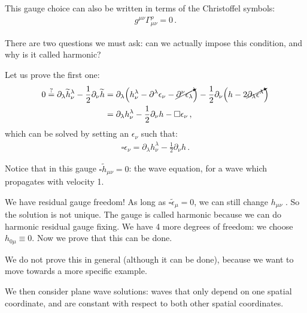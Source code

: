 \documentclass[main.tex]{subfiles}
\begin{document}
\begin{bluebox}
This gauge choice can also be written in terms of the Christoffel symbols: 
%
\begin{align}
g^{\mu \nu } \Gamma^{\rho }_{\mu \nu } = 0
\,.
\end{align}
%
\end{bluebox}

There are two questions we must ask: can we actually impose this condition, and why is it called harmonic? 

Let us prove the first one: 
%
\begin{subequations}
\begin{align}
0 \overset{?}{=} \partial_{\lambda } \widetilde{h}^{\lambda }_{\nu } - \frac{1}{2} \partial_{\nu }\widetilde{h}
&= \partial_{\lambda } \qty( h^{\lambda }_{\nu } - \partial^{\lambda } \epsilon_{\nu } - \cancelto{}{\partial^{\nu } \epsilon_{\lambda }} ) - \frac{1}{2} \partial_{\nu } \qty(h - 2 \cancelto{}{\partial_{\lambda } \epsilon^{\lambda }})  \\
&= \partial_{\lambda } h^{\lambda }_{\nu } - \frac{1}{2} \partial_{\nu } h  - \square \epsilon_{\nu }
\,,
\end{align}
\end{subequations}
%
which can be solved by setting an \(\epsilon_{\nu }\) such that:
%
\begin{align}
  \square  \epsilon_{\nu } = \partial_{\lambda } h^{\lambda }_{\nu } - \frac{1}{2} \partial_{\nu } h
\,.
\end{align}

Notice that in this gauge \(\square \widetilde{h}_{\mu \nu } = 0 \): the wave equation, for a wave which propagates with velocity 1. 

We have residual gauge freedom! As long as \(\square \widetilde{\epsilon}_{\mu} = 0\), we can still change \(h_{\mu \nu }\) .
So the solution is not unique. The gauge is called harmonic because we can do harmonic residual gauge fixing. 
We have 4 more degrees of freedom: we choose \(h_{0 \mu } \equiv 0\). Now we prove that this can be done. 

We do not prove this in general (although it can be done), because we want to move towards a more specific example. 

We then consider plane wave solutions: waves that only depend on one spatial coordinate, and are constant with respect to both other spatial coordinates. 
\end{document}
